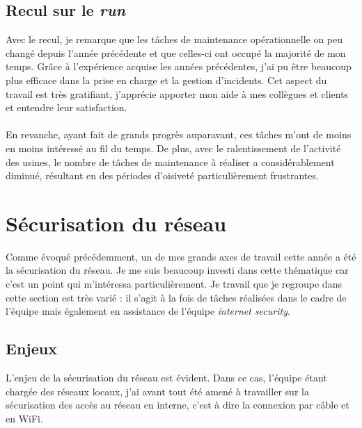 \documentclass[a4paper,12pt]{report}
\begin{document}
\subsection{Recul sur le \textit{run}}
Avec le recul, je remarque que les tâches de maintenance opérationnelle on peu changé depuis l'année précédente et que celles-ci ont occupé la majorité de mon temps. Grâce à l'expérience acquise les années précédentes, j'ai pu être beaucoup plus efficace dans la prise en charge et la gestion d'incidents. Cet aspect du travail est très gratifiant, j'apprécie apporter mon aide à mes collègues et clients et entendre leur satisfaction.
\paragraph{}
En revanche, ayant fait de grands progrès auparavant, ces tâches m'ont de moins en moins intéressé au fil du temps. De plus, avec le ralentissement de l'activité des usines, le nombre de tâches de maintenance à réaliser a considérablement diminué, résultant en des périodes d'oisiveté particulièrement frustrantes.

\section{Sécurisation du réseau}
Comme évoqué précédemment, un de mes grands axes de travail cette année a été la sécurisation du réseau. Je me suis beaucoup investi dans cette thématique car c'est un point qui m'intéressa particulièrement. Je travail que je regroupe dans cette section est très varié : il s'agit à la fois de tâches réalisées dans le cadre de l'équipe mais également en assistance de l'équipe \textit{internet security}.
\subsection{Enjeux}
L'enjeu de la sécurisation du réseau est évident. Dans ce cas, l'équipe étant chargée des réseaux locaux, j'ai avant tout été amené à travailler sur la sécurisation des accès au réseau en interne, c'est à dire la connexion par câble et en WiFi. 
\end{document}
